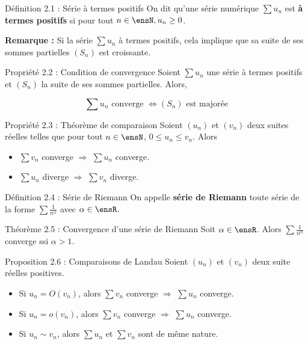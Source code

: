 \begin{theorem}[red]{Définition 2.1 : Série à termes positifs}
    On dit qu'une série numérique $\sum u_n$ est \textbf{à termes positifs} si pour tout $n \in \ensN, u_n \geq 0$.
\end{theorem}

\noindent \textbf{Remarque :} Si la série $\sum u_n$ à termes positifs, cela implique que sa suite de ses sommes partielles $(S_n)$ est croissante.

\begin{theorem}[blue]{Propriété 2.2 : Condition de convergence}
    Soient $\sum u_n$ une série à termes positifs et $(S_n)$ la suite de ses sommes partielles. Alors,

    $$
        \sum u_n \text{ converge } \Longleftrightarrow (S_n) \text{ est majorée}
    $$
\end{theorem}

\begin{theorem}[blue]{Propriété 2.3 : Théorème de comparaison}
    Soient $(u_n)$ et $(v_n)$ deux suites réelles telles que pour tout $n \in \ensN$, $0 \leq u_n \leq v_n$. Alors

    \begin{itemize}
        \item $\sum v_n$ converge $\Longrightarrow$ $\sum u_n$ converge.
        \item $\sum u_n$ diverge $\Longrightarrow$ $\sum v_n$ diverge.
    \end{itemize}
\end{theorem}

\begin{theorem}[red]{Définition 2.4 : Série de Riemann}
    On appelle \textbf{série de Riemann} toute série de la forme $\displaystyle \sum \frac{1}{n^\alpha}$ avec $\alpha \in \ensR$.
\end{theorem}

\begin{theorem}[orange]{Théorème 2.5 : Convergence d'une série de Riemann}
    Soit $\alpha \in \ensR$. Alors $\displaystyle \sum \frac{1}{n^\alpha}$ converge ssi $\alpha > 1$.
\end{theorem}

\begin{theorem}[blue]{Proposition 2.6 : Comparaisons de Landau}
    Soient $(u_n)$ et $(v_n)$ deux suite réelles positives.

    \begin{itemize}
        \item Si $u_n = O(v_n)$, alors $\sum v_n$ converge $\Longrightarrow$ $\sum u_n$ converge.
        \item Si $u_n = o(v_n)$, alors $\sum v_n$ converge $\Longrightarrow$ $\sum u_n$ converge.
        \item Si $u_n \sim v_n$, alors $\sum u_n$ et $\sum v_n$ sont de même nature.
    \end{itemize}
\end{theorem}

